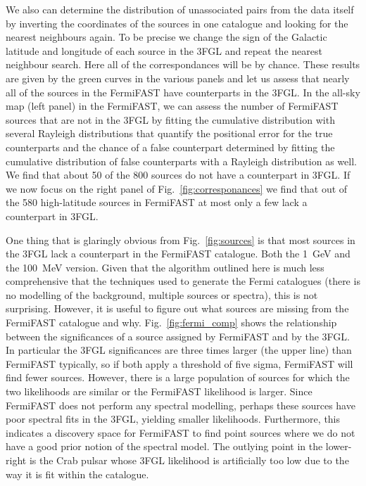 \documentclass[useAMS,usenatbib]{mn2e}
\begin{document}
We also can determine the distribution of unassociated pairs from the
data itself by inverting the coordinates of the sources in one
catalogue and looking for the nearest neighbours again.  To be precise
we change the sign of the Galactic latitude and longitude of each
source in the 3FGL and repeat the nearest neighbour search.  Here all
of the correspondances will be by chance.  These results are given by
the green curves in the various panels and let us assess that nearly
all of the sources in the FermiFAST have counterparts in the 3FGL.  In
the all-sky map (left panel) in the FermiFAST, we can assess the
number of FermiFAST sources that are not in the 3FGL by fitting the
cumulative distribution with several Rayleigh distributions that
quantify the positional error for the true counterparts and the chance
of a false counterpart determined by fitting the cumulative
distribution of false counterparts with a Rayleigh distribution as
well.  We find that about 50 of the 800 sources do not have a
counterpart in 3FGL.  If we now focus on the right panel of
Fig.~\ref{fig:corresponances} we find that out of the 580
high-latitude sources in FermiFAST at most only a few lack a
counterpart in 3FGL.

One thing that is glaringly obvious from Fig.~\ref{fig:sources} is
that most sources in the 3FGL lack a counterpart in the FermiFAST
catalogue.  Both the 1~GeV and the 100~MeV version.  Given that the
algorithm outlined here is much less comprehensive that the techniques
used to generate the Fermi catalogues (there is no modelling of the
background, multiple sources or spectra), this is not surprising.
However, it is useful to figure out what sources are missing from the
FermiFAST catalogue and why.  Fig.~\ref{fig:fermi_comp} 
shows the relationship between the significances of a source
assigned by FermiFAST and by the 3FGL.  In particular the 3FGL
significances are three times larger (the upper line) than FermiFAST
typically, so if both apply a threshold of five sigma, FermiFAST will
find fewer sources.  However, there is a large population of sources
for which the two likelihoods are similar or the FermiFAST likelihood
is larger.  Since FermiFAST does not perform any spectral modelling,
perhaps these sources have poor spectral fits in the 3FGL, yielding
smaller likelihoods.  Furthermore, this indicates a discovery space
for FermiFAST to find point sources where we do not have a good prior
notion of the spectral model.  The outlying point in the lower-right
is the Crab pulsar whose 3FGL likelihood is artificially too low due
to the way it is fit within the catalogue.
\end{document}
